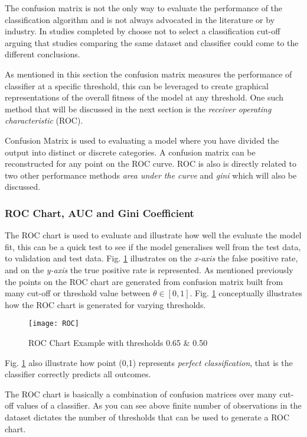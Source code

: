 The confusion matrix is not the only way to evaluate the performance of the classification algorithm and is not always advocated in the literature or by industry. In studies completed by \citep{lessmann_benchmarking_2008} choose not to select a classification cut-off arguing that studies comparing the same dataset and classifier could come to the different conclusions.

As mentioned in this section the confusion matrix measures the performance of classifier at a specific threshold, this can be leveraged to create graphical representations of the overall fitness of the model at any threshold. One such method that will be discussed in the next section is the \textit{receiver operating characteristic} (ROC). 


Confusion Matrix is used to evaluating a model where you have divided the output into distinct or discrete categories. A confusion matrix can be reconstructed for any point on the ROC curve. ROC is also is directly related to two other performance methods \textit{area under the curve} and \textit{gini} which will also be discussed.  

\subsubsection{ROC Chart, AUC and Gini Coefficient}
The ROC chart is used to evaluate and illustrate how well the evaluate the model fit, this can be a quick test to see if the model generalises well from the test data, to validation and test data. Fig. \ref{fig:ROC} illustrates on the \textit{x-axis} the false positive rate, and on the \textit{y-axis} the true positive rate is represented. As mentioned previously the points on the ROC chart are generated from confusion matrix built from many cut-off or threshold value between $\theta \in [0,1]$. Fig. \ref{fig:ROC} conceptually illustrates how the ROC chart is generated for varying thresholds. 

\begin{figure}[H]
	\texttt{[image: ROC]}
	\caption[ROC]
	{ROC Chart Example with thresholds 0.65 \& 0.50}
	\label{fig:ROC}
\end{figure}

Fig. \ref{fig:ROC} also illustrate how point (0,1) represents \textit{perfect classification}, that is the classifier correctly predicts all outcomes. 

The ROC chart is basically a combination of confusion matrices over many cut-off values of a classifier. As you can see above finite number of observations in the dataset dictates the number of thresholds that can be used to generate a ROC chart.

